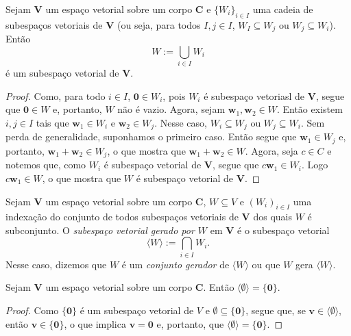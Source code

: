 \begin{proposition}
	Sejam $\bm V$ um espaço vetorial sobre um corpo $\bm C$ e $\{W_i\}_{i \in I}$ uma cadeia de subespaços vetoriais de $\bm V$ (ou seja, para todos $I,j \in I$, $W_I \subseteq W_j$ ou $W_j \subseteq W_i$). Então
	\begin{equation*}
	W := \bigcup_{i \in I} W_i
	\end{equation*}
é um subespaço vetorial de $\bm V$.
\end{proposition}
\begin{proof}
	Como, para todo $i \in I$, $\bm 0 \in W_i$, pois $W_i$ é subespaço vetoriasl de $\bm V$, segue que $\bm 0 \in W$ e, portanto, $W$ não é vazio. Agora, sejam $\bm w_1,\bm w_2 \in W$. Então existem $i,j \in I$ tais que $\bm w_1 \in W_i$ e $\bm w_2 \in W_j$. Nesse caso, $W_i \subseteq W_j$ ou $W_j \subseteq W_i$. Sem perda de generalidade, suponhamos o primeiro caso. Então segue que $\bm w_1 \in W_j$ e, portanto, $\bm w_1+\bm w_2 \in W_j$, o que mostra que $\bm w_1+\bm w_2 \in W$. Agora, seja $c \in C$ e notemos que, como $W_i$ é subespaço vetorial de $\bm V$, segue que $c\bm w_1 \in W_i$. Logo $c\bm w_1 \in W$, o que mostra que $W$ é subespaço vetorial de $\bm V$.
\end{proof}

\begin{definition}
	Sejam $\bm V$ um espaço vetorial sobre um corpo $\bm C$, $W \subseteq V$ e $(W_i)_{i \in I}$ uma indexação do conjunto de todos subespaços vetoriais de $\bm V$ dos quais $W$ é subconjunto. O \emph{subespaço vetorial gerado por $W$} em $\bm V$ é o subespaço vetorial
	\begin{equation*}
	\langle W \rangle := \bigcap_{i \in I} W_i.
	\end{equation*}
Nesse caso, dizemos que $W$ é um \emph{conjunto gerador} de $\langle W \rangle$ ou que $W$ gera $\langle W \rangle$.


\end{definition}

\begin{proposition}
	Sejam $\bm V$ um espaço vetorial sobre um corpo $\bm C$. Então $\langle \emptyset \rangle = \{\bm 0\}$.
\end{proposition}
\begin{proof}
	Como $\{\bm  0\}$ é um subespaço vetorial de $V$ e $\emptyset \subseteq \{\bm 0\}$, segue que, se $\bm v \in \langle \emptyset \rangle$, então $\bm v \in \{\bm 0\}$, o que implica $\bm v = \bm 0$ e, portanto, que $\langle \emptyset \rangle = \{\bm 0\}$.
\end{proof}

